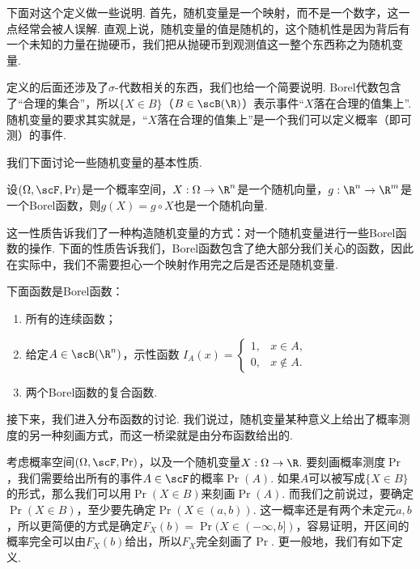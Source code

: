下面对这个定义做一些说明. 首先，随机变量是一个映射，而不是一个数字，这一点经常会被人误解. 直观上说，随机变量的值是随机的，这个随机性是因为背后有一个未知的力量在抛硬币，我们把从抛硬币到观测值这一整个东西称之为随机变量. 

定义的后面还涉及了$\sigma$-代数相关的东西，我们也给一个简要说明. Borel代数包含了“合理的集合”，所以$\{X\in B\}$（$B\in\scB(\R)$）表示事件“$X$落在合理的值集上”. 随机变量的要求其实就是，“$X$落在合理的值集上”是一个我们可以定义概率（即可测）的事件. 

我们下面讨论一些随机变量的基本性质. 

\begin{theorem}\label{thm:random-variable}
设$(\Omega,\scF,\Pr)$是一个概率空间，$X:\Omega\to\R^n$是一个随机向量，$g:\R^n\to\R^m$是一个Borel函数，则$g(X)=g\circ X$也是一个随机向量. 
\end{theorem}

这一性质告诉我们了一种构造随机变量的方式：对一个随机变量进行一些Borel函数的操作. 下面的性质告诉我们，Borel函数包含了绝大部分我们关心的函数，因此在实际中，我们不需要担心一个映射作用完之后是否还是随机变量.

\begin{proposition}\label{prop:borel-function}
下面函数是Borel函数：
\begin{enumerate}
    \item 所有的连续函数；
    \item 给定$A\in\scB(\R^n)$，示性函数
    $I_A(x) = \begin{cases}
        1, & x\in A,\\
        0, & x\notin A.
    \end{cases}$
    \item 两个Borel函数的复合函数. 
\end{enumerate}
\end{proposition}



接下来，我们进入分布函数的讨论. 我们说过，随机变量某种意义上给出了概率测度的另一种刻画方式，而这一桥梁就是由分布函数给出的. 

考虑概率空间$(\Omega,\scF,\Pr)$，以及一个随机变量$X:\Omega\to\R$. 要刻画概率测度$\Pr$，我们需要给出所有的事件$A\in\scF$的概率$\Pr(A)$. 如果$A$可以被写成$\{X\in B\}$的形式，那么我们可以用$\Pr(X\in B)$来刻画$\Pr(A)$. 而我们之前说过，要确定$\Pr(X\in B)$，至少要先确定$\Pr(X\in(a,b))$. 这一概率还是有两个未定元$a,b$，所以更简便的方式是确定$F_X(b)=\Pr(X\in(-\infty,b])$，容易证明，开区间的概率完全可以由$F_X(b)$给出，所以$F_X$完全刻画了$\Pr$. 更一般地，我们有如下定义. 

